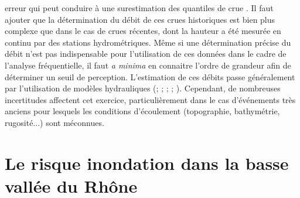 erreur qui peut conduire à une surestimation des quantiles de crue \citep{prosdocimi_german_2018}. Il faut ajouter que la détermination du débit de ces crues historiques est bien plus complexe que dans le cas de crues récentes, dont la hauteur a été mesurée en continu par des stations hydrométriques. Même si une détermination précise du débit n'est pas indispensable pour l'utilisation de ces données dans le cadre de l'analyse fréquentielle, il faut \textit{a minima} en connaitre l'ordre de grandeur afin de déterminer un seuil de perception. L'estimation de ces débits passe généralement par l'utilisation de modèles hydrauliques (\cite{naulet_flood_2005}; \cite{neppel_flood_2010}; \cite{wetter_largest_2011}; \cite{machado_flood_2015}; \cite{ruiz-bellet_uncertainty_2017}). Cependant, de nombreuses incertitudes affectent cet exercice, particulièrement dans le cas d'événements très anciens pour lesquels les conditions d'écoulement (topographie, bathymétrie, rugosité...) sont méconnues. 

		
	\section*{Le risque inondation dans la basse vallée du Rhône}
	
